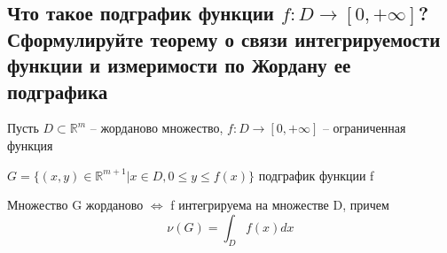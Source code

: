 
\subsection{Что такое подграфик функции $f : D \rightarrow [0, +\infty]$? Сформулируйте теорему о связи интегрируемости функции и измеримости по Жордану ее подграфика}
Пусть $D \subset \mathbb{R}^m$ -- жорданово множество, $f : D \rightarrow [0, +\infty]$ -- ограниченная функция

$G = \{(x, y)\in \mathbb{R}^{m + 1}|x\in D, 0\leqslant y\leqslant f(x)\}$
подграфик функции f

\begin{theorem*}
    Множество G жорданово $\Longleftrightarrow$ f интегрируема на множестве D, причем
    \[\nu(G) = \int_{D}^{}f(x)dx\]
\end{theorem*}

